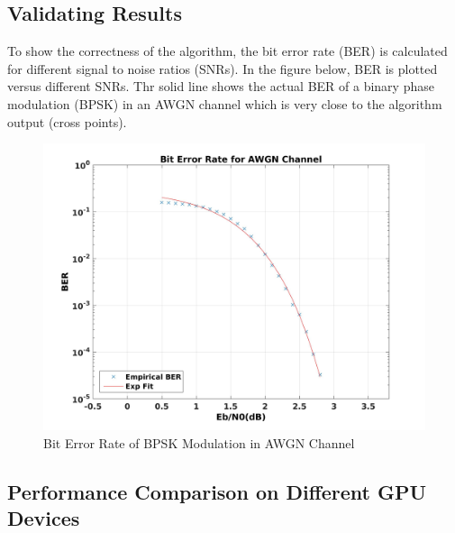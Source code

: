\documentclass[10pt,a4paper]{article}
\begin{document}
\subsection{Validating Results}
To show the correctness of the algorithm, the bit error rate (BER) is calculated for different signal to noise ratios (SNRs). In the figure below, BER is plotted versus different SNRs. Thr solid line shows the actual BER of a binary phase modulation (BPSK) in an AWGN channel which is very close to the algorithm output (cross points).

\begin{figure}[H]
\begin{centering}
\includegraphics[scale=0.15]{BER.jpg}
\caption[width=.5\textwidth]{Bit Error Rate of BPSK Modulation in AWGN Channel}\label{fig::ber}
\end{centering}
\end{figure}

\subsection{Performance Comparison on Different GPU Devices}
\end{document}
